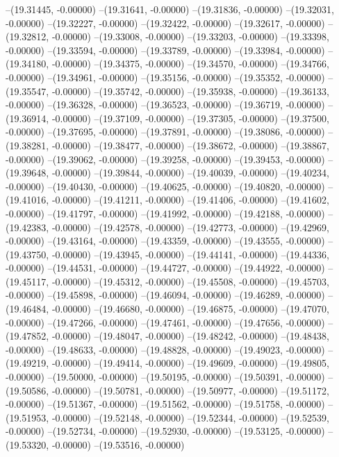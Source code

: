 --(19.31445, -0.00000)
--(19.31641, -0.00000)
--(19.31836, -0.00000)
--(19.32031, -0.00000)
--(19.32227, -0.00000)
--(19.32422, -0.00000)
--(19.32617, -0.00000)
--(19.32812, -0.00000)
--(19.33008, -0.00000)
--(19.33203, -0.00000)
--(19.33398, -0.00000)
--(19.33594, -0.00000)
--(19.33789, -0.00000)
--(19.33984, -0.00000)
--(19.34180, -0.00000)
--(19.34375, -0.00000)
--(19.34570, -0.00000)
--(19.34766, -0.00000)
--(19.34961, -0.00000)
--(19.35156, -0.00000)
--(19.35352, -0.00000)
--(19.35547, -0.00000)
--(19.35742, -0.00000)
--(19.35938, -0.00000)
--(19.36133, -0.00000)
--(19.36328, -0.00000)
--(19.36523, -0.00000)
--(19.36719, -0.00000)
--(19.36914, -0.00000)
--(19.37109, -0.00000)
--(19.37305, -0.00000)
--(19.37500, -0.00000)
--(19.37695, -0.00000)
--(19.37891, -0.00000)
--(19.38086, -0.00000)
--(19.38281, -0.00000)
--(19.38477, -0.00000)
--(19.38672, -0.00000)
--(19.38867, -0.00000)
--(19.39062, -0.00000)
--(19.39258, -0.00000)
--(19.39453, -0.00000)
--(19.39648, -0.00000)
--(19.39844, -0.00000)
--(19.40039, -0.00000)
--(19.40234, -0.00000)
--(19.40430, -0.00000)
--(19.40625, -0.00000)
--(19.40820, -0.00000)
--(19.41016, -0.00000)
--(19.41211, -0.00000)
--(19.41406, -0.00000)
--(19.41602, -0.00000)
--(19.41797, -0.00000)
--(19.41992, -0.00000)
--(19.42188, -0.00000)
--(19.42383, -0.00000)
--(19.42578, -0.00000)
--(19.42773, -0.00000)
--(19.42969, -0.00000)
--(19.43164, -0.00000)
--(19.43359, -0.00000)
--(19.43555, -0.00000)
--(19.43750, -0.00000)
--(19.43945, -0.00000)
--(19.44141, -0.00000)
--(19.44336, -0.00000)
--(19.44531, -0.00000)
--(19.44727, -0.00000)
--(19.44922, -0.00000)
--(19.45117, -0.00000)
--(19.45312, -0.00000)
--(19.45508, -0.00000)
--(19.45703, -0.00000)
--(19.45898, -0.00000)
--(19.46094, -0.00000)
--(19.46289, -0.00000)
--(19.46484, -0.00000)
--(19.46680, -0.00000)
--(19.46875, -0.00000)
--(19.47070, -0.00000)
--(19.47266, -0.00000)
--(19.47461, -0.00000)
--(19.47656, -0.00000)
--(19.47852, -0.00000)
--(19.48047, -0.00000)
--(19.48242, -0.00000)
--(19.48438, -0.00000)
--(19.48633, -0.00000)
--(19.48828, -0.00000)
--(19.49023, -0.00000)
--(19.49219, -0.00000)
--(19.49414, -0.00000)
--(19.49609, -0.00000)
--(19.49805, -0.00000)
--(19.50000, -0.00000)
--(19.50195, -0.00000)
--(19.50391, -0.00000)
--(19.50586, -0.00000)
--(19.50781, -0.00000)
--(19.50977, -0.00000)
--(19.51172, -0.00000)
--(19.51367, -0.00000)
--(19.51562, -0.00000)
--(19.51758, -0.00000)
--(19.51953, -0.00000)
--(19.52148, -0.00000)
--(19.52344, -0.00000)
--(19.52539, -0.00000)
--(19.52734, -0.00000)
--(19.52930, -0.00000)
--(19.53125, -0.00000)
--(19.53320, -0.00000)
--(19.53516, -0.00000)
